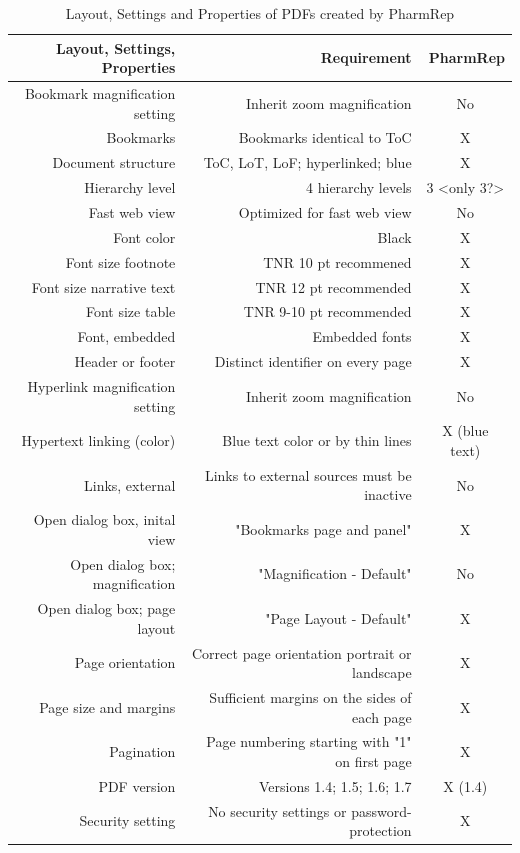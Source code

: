 \documentclass{pharmrep}
\begin{document}
\begin{table}[htbp]
\centering
\caption{Layout, Settings and Properties of PDFs created by PharmRep}\label{tab:PDFProp}
\begin{tabular}{rrr}
\toprule
Layout, Settings, Properties & Requirement & PharmRep \\
\midrule
Bookmark magnification setting  & Inherit zoom magnification & \multicolumn{1}{c}{No} \\
Bookmarks & Bookmarks identical to ToC & \multicolumn{1}{c}{X} \\
Document structure & ToC, LoT, LoF; hyperlinked; blue  & \multicolumn{1}{c}{X} \\
Hierarchy level & 4 hierarchy levels & \multicolumn{1}{c}{3 <only 3?>} \\
Fast web view  & Optimized for fast web view & \multicolumn{1}{c}{No} \\
Font color & Black  & \multicolumn{1}{c}{X} \\
Font size footnote & TNR 10 pt recommened & \multicolumn{1}{c}{X} \\
Font size narrative text & TNR 12 pt recommended & \multicolumn{1}{c}{X} \\
Font size table & TNR 9-10 pt recommended & \multicolumn{1}{c}{X} \\
Font, embedded & Embedded fonts  & \multicolumn{1}{c}{X} \\
Header or footer & Distinct identifier on every page & \multicolumn{1}{c}{X} \\
Hyperlink magnification setting & Inherit zoom magnification & \multicolumn{1}{c}{No} \\
Hypertext linking (color) & Blue text color or by thin lines  & \multicolumn{1}{c}{X (blue text)} \\
Links, external & Links to external sources must be inactive  & \multicolumn{1}{c}{No} \\
Open dialog box, inital view & "Bookmarks page and panel"  & \multicolumn{1}{c}{X} \\
Open dialog box; magnification & "Magnification - Default" & \multicolumn{1}{c}{No } \\
Open dialog box; page layout & "Page Layout - Default" & \multicolumn{1}{c}{X} \\
Page orientation & Correct page orientation portrait or landscape & \multicolumn{1}{c}{X} \\
Page size and margins & Sufficient margins on the sides of each page & \multicolumn{1}{c}{X} \\
Pagination & Page numbering starting with "1" on first page & \multicolumn{1}{c}{X} \\
PDF version & Versions 1.4; 1.5; 1.6; 1.7  & \multicolumn{1}{c}{X (1.4)} \\
Security setting & No security settings or password-protection  & \multicolumn{1}{c}{X} \\
\bottomrule
\end{tabular}%
\label{tab:addlabel}%
\end{table}%
\end{document}
